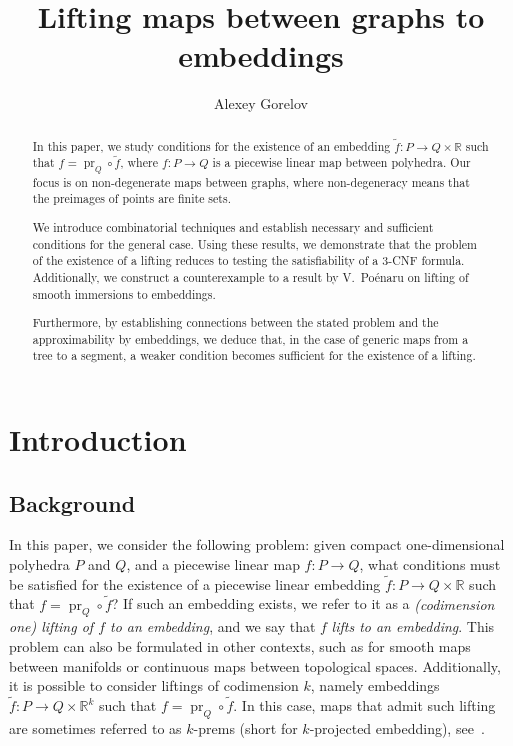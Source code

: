 \documentclass[a4paper,12pt,reqno,oneside]{amsart}
\author{Alexey Gorelov}
\title{Lifting maps between graphs to embeddings}
\theoremstyle{plain}
\theoremstyle{definition}
\theoremstyle{plain}
\newcommand{\from}{\colon}
\newcommand{\wt}[1]{\widetilde{#1}}
\newcommand{\R}{\mathbb{R}}
\DeclareMathOperator{\pr}{pr}
\begin{document}
\maketitle

\begin{abstract}
  In this paper, we study conditions for the existence of an embedding
  $\wt{f} \from P \to Q \times \R$ such that $f = \pr_Q \circ \wt{f}$, where $f \from P \to Q$ is a
  piecewise linear map between polyhedra. Our focus is on non-degenerate maps between graphs, where
  non-degeneracy means that the preimages of points are finite sets.

  We introduce combinatorial techniques and establish necessary and sufficient conditions for the
  general case. Using these results, we demonstrate that the problem of the existence of a lifting reduces
  to testing the satisfiability of a 3-CNF formula. Additionally, we construct
  a counterexample to a result by V.~Po\'{e}naru on lifting of smooth immersions to
  embeddings.

  Furthermore, by establishing connections between the stated problem and the approximability by
  embeddings, we deduce that, in the case of generic maps from a tree to a segment, a weaker
  condition becomes sufficient for the existence of a lifting.
\end{abstract}


\section{Introduction}

\subsection{Background}

In this paper, we consider the following problem: given compact one-dimensional polyhedra $P$ and
$Q$, and a piecewise linear map $f \from P \to Q$, what conditions must be satisfied for the
existence of a piecewise linear embedding $\wt{f} \from P \to Q \times \R$ such that
$f = \pr_Q \circ \wt{f}$? If such an embedding exists, we refer to it as a \emph{(codimension one)
  lifting of $f$ to an embedding}, and we say that $f$ \emph{lifts to an embedding}. This problem
can also be formulated in other contexts, such as for smooth maps between manifolds or continuous
maps between topological spaces. Additionally, it is possible to consider liftings of codimension
$k$, namely embeddings $\widetilde{f} \from P \to Q \times \mathbb{R}^k$ such that
$f = \pr_Q \circ \widetilde{f}$. In this case, maps that admit such lifting are sometimes referred
to as $k$-prems (short for $k$-projected embedding), see~\cite{szucs,akhmet,mel}.
\end{document}
